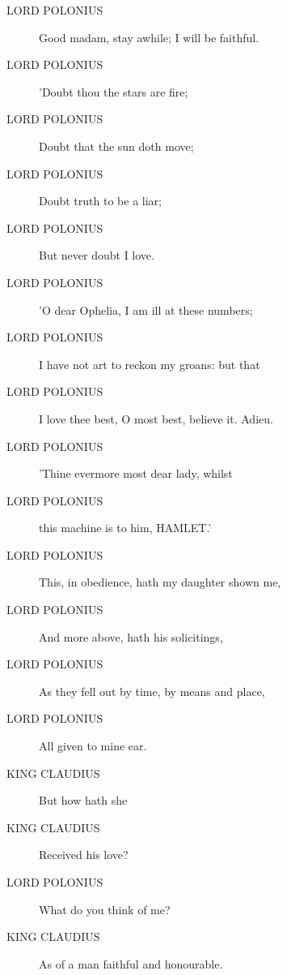 \documentclass{article}
\begin{document}
\begin{description}
            
\item[LORD POLONIUS] Good madam, stay awhile; I will be faithful.
\item[LORD POLONIUS] 'Doubt thou the stars are fire;
\item[LORD POLONIUS] Doubt that the sun doth move;
\item[LORD POLONIUS] Doubt truth to be a liar;
\item[LORD POLONIUS] But never doubt I love.
\item[LORD POLONIUS] 'O dear Ophelia, I am ill at these numbers;
\item[LORD POLONIUS] I have not art to reckon my groans: but that
\item[LORD POLONIUS] I love thee best, O most best, believe it. Adieu.
\item[LORD POLONIUS] 'Thine evermore most dear lady, whilst
\item[LORD POLONIUS] this machine is to him, HAMLET.'
\item[LORD POLONIUS] This, in obedience, hath my daughter shown me,
\item[LORD POLONIUS] And more above, hath his solicitings,
\item[LORD POLONIUS] As they fell out by time, by means and place,
\item[LORD POLONIUS] All given to mine ear.
\end{description}
          
\begin{description}
            
\item[KING CLAUDIUS] But how hath she
\item[KING CLAUDIUS] Received his love?
\end{description}
          
\begin{description}
            
\item[LORD POLONIUS] What do you think of me?
\end{description}
          
\begin{description}
            
\item[KING CLAUDIUS] As of a man faithful and honourable.
\end{description}
          
\end{document}

